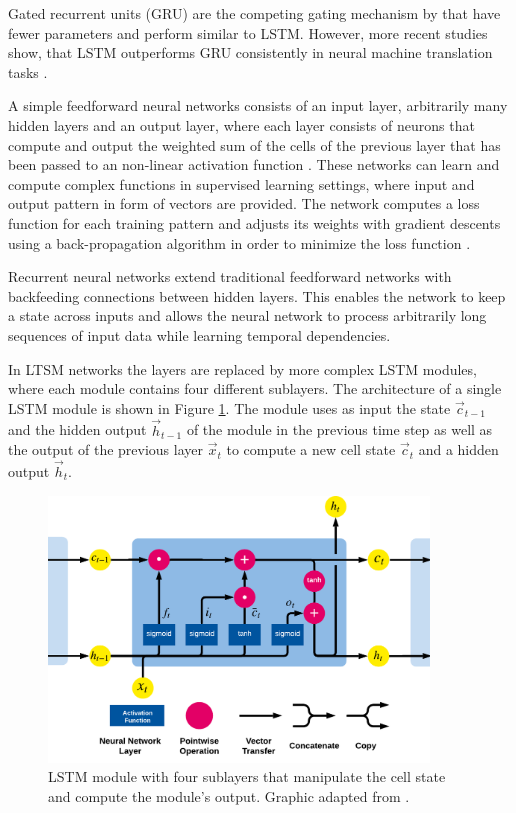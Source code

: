 Gated recurrent units (GRU) \cite{DBLP:conf/emnlp/ChoMGBBSB14} are the competing gating mechanism by \citeauthor{DBLP:conf/emnlp/ChoMGBBSB14} that have fewer parameters and perform similar to LSTM.
However, more recent studies show, that LSTM outperforms GRU consistently in neural machine translation tasks \cite{DBLP:journals/corr/BritzGLL17}.

A simple feedforward neural networks consists of an input layer, arbitrarily many hidden layers and an output layer, where each layer consists of neurons that compute and output the weighted sum of the cells of the previous layer that has been passed to an non-linear activation function \cite{DBLP:journals/nn/Schmidhuber15}.
These networks can learn and compute complex functions in supervised learning settings, where input and output pattern in form of vectors are provided.
The network computes a loss function for each training pattern and adjusts its weights with gradient descents using a back-propagation algorithm in order to minimize the loss function \cite{rumelhart1986learning}.

Recurrent neural networks extend traditional feedforward networks with backfeeding connections between hidden layers.
This enables the network to keep a state across inputs and allows the neural network to process arbitrarily long sequences of input data while learning temporal dependencies.

In LTSM networks the layers are replaced by more complex LSTM modules, where each module contains four different sublayers.
The architecture of a single LSTM module is shown in Figure \ref{fig:lstm-module}.
The module uses as input the state $\vec{c}_{t-1}$ and the hidden output $\vec{h}_{t-1}$ of the module in the previous time step as well as the output of the previous layer $\vec{x}_t$ to compute a new cell state $\vec{c}_{t}$ and a hidden output $\vec{h}_{t}$.

\begin{figure}[htbp!]
	\centering
	\includegraphics[width=0.9\textwidth]{figures/lstm-module}
	\caption[Structure of an LSTM module]{LSTM module with four sublayers that manipulate the cell state and compute the module's output. Graphic adapted from \cite{lstm-blog}.}
	\label{fig:lstm-module}
\end{figure}

